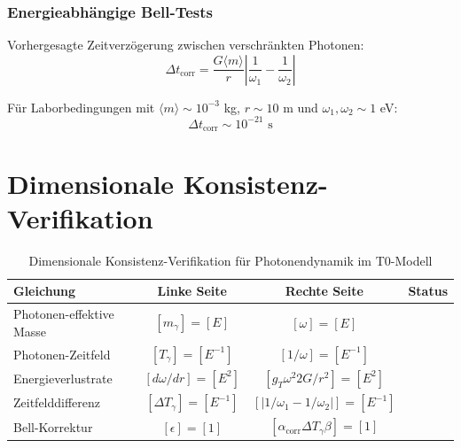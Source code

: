 	\subsubsection{Energieabhängige Bell-Tests}
	
	Vorhergesagte Zeitverzögerung zwischen verschränkten Photonen:
	\begin{equation}
		\Delta t_{\text{corr}} = \frac{G\langle m \rangle}{r} \left|\frac{1}{\omega_1} - \frac{1}{\omega_2}\right|
		\label{eq:correlation_time_delay}
	\end{equation}
	
	Für Laborbedingungen mit $\langle m \rangle \sim 10^{-3}$ kg, $r \sim 10$ m und $\omega_1,\omega_2 \sim 1$ eV:
	\begin{equation}
		\Delta t_{\text{corr}} \sim 10^{-21} \text{ s}
		\label{eq:laboratory_delay}
	\end{equation}

	\section{Dimensionale Konsistenz-Verifikation}
	
	\begin{table}[htbp]
		\centering
		\begin{tabular}{lccl}
			\toprule
			\textbf{Gleichung} & \textbf{Linke Seite} & \textbf{Rechte Seite} & \textbf{Status} \\
			\midrule
			Photonen-effektive Masse & $[m_\gamma] = [E]$ & $[\omega] = [E]$ & \checkmark \\
			Photonen-Zeitfeld & $[T_\gamma] = [E^{-1}]$ & $[1/\omega] = [E^{-1}]$ & \checkmark \\
			Energieverlustrate & $[d\omega/dr] = [E^2]$ & $[g_T \omega^2 2G/r^2] = [E^2]$ & \checkmark \\
			Zeitfelddifferenz & $[\Delta T_\gamma] = [E^{-1}]$ & $[|1/\omega_1 - 1/\omega_2|] = [E^{-1}]$ & \checkmark \\
			Bell-Korrektur & $[\epsilon] = [1]$ & $[\alpha_{\text{corr}} \Delta T_\gamma \beta] = [1]$ & \checkmark \\
			\bottomrule
		\end{tabular}
		\caption{Dimensionale Konsistenz-Verifikation für Photonendynamik im T0-Modell}
	\end{table}
	

	